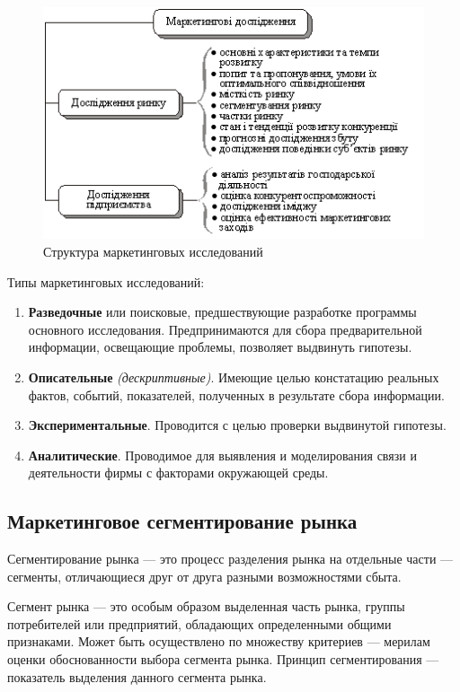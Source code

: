 \documentclass[a4paper,12pt,oneside,final]{extarticle}
\makeatletter
\numberwithin{equation}{section}
\def\maxwidth#1{\ifdim\Gin@nat@width>#1 #1\else\Gin@nat@width\fi}
\makeatother
\begin{document}
\begin{figure}[h]
	\centering
	\includegraphics[width=\maxwidth{\textwidth}]{management-figures/marketing_structure}
	\caption{Структура маркетинговых исследований}
\end{figure}

Типы маркетинговых исследований:
\begin{enumerate}
	\item \textbf{Разведочные} или поисковые, предшествующие разработке программы основного исследования. 
	Предпринимаются для сбора предварительной информации, освещающие проблемы, позволяет выдвинуть гипотезы.
	\item \textbf{Описательные} \textit{(дескриптивные)}. 
	Имеющие целью констатацию реальных фактов, событий, показателей, полученных в результате сбора информации. 
	\item \textbf{Экспериментальные}. 
	Проводится с целью проверки выдвинутой гипотезы.
	\item \textbf{Аналитические}. 
	Проводимое для выявления и моделирования связи и деятельности фирмы с факторами окружающей среды. 
\end{enumerate}

\subsection{Маркетинговое сегментирование рынка}
Сегментирование рынка --- это процесс разделения рынка на отдельные части --- сегменты, отличающиеся друг от друга разными возможностями сбыта.

Сегмент рынка --- это особым образом выделенная часть рынка, группы потребителей или предприятий, обладающих определенными общими признаками. 
Может быть осуществлено по множеству критериев --- мерилам оценки обоснованности выбора сегмента рынка. 
Принцип сегментирования --- показатель выделения данного сегмента рынка. 
\end{document}
